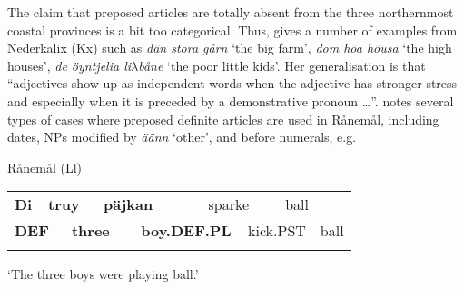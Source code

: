\begin{styleBodytextC}
The claim that preposed articles are totally absent from the three northernmost coastal provinces is a bit too categorical. Thus, \citet[141]{Rutberg1924} gives a number of examples from Nederkalix (Kx) such as \textit{dän stora gårn }‘the big farm’, \textit{dom höa höusa }‘the high houses’, \textit{de öyntjelia li$\lambda $båne }‘the poor little kids’. Her generalisation is that “adjectives show up as independent words when the adjective has stronger stress and especially when it is preceded by a demonstrative pronoun …”. \citet[114]{Wikberg2004} notes several types of cases where preposed definite articles are used in Rånemål, including dates, NPs modified by \textit{äänn} ‘other’, and before numerals, e.g.

\end{styleBodytextC}

\begin{listWWNumileveli}
\item {}

\begin{styleExample}
Rånemål (Ll)

\end{styleExample}

\end{listWWNumileveli}

\begin{tabular}{llllllllll}
\lsptoprule
{\bfseries Di} & \multicolumn{2}{l}{{\bfseries truy}

} & \multicolumn{2}{l}{{\bfseries päjkan}

} & \multicolumn{2}{l}{sparke

} & \multicolumn{2}{l}{ball

} & \\
\multicolumn{2}{l}{{\bfseries DEF}

} & \multicolumn{2}{l}{{\bfseries three}

} & \multicolumn{2}{l}{{\bfseries boy.DEF.PL}

} & \multicolumn{2}{l}{kick.PST

} & \multicolumn{2}{l}{ball

}\\
\lspbottomrule
\end{tabular}

\begin{styleTranslation}
‘The three boys were playing ball.’

\end{styleTranslation}

